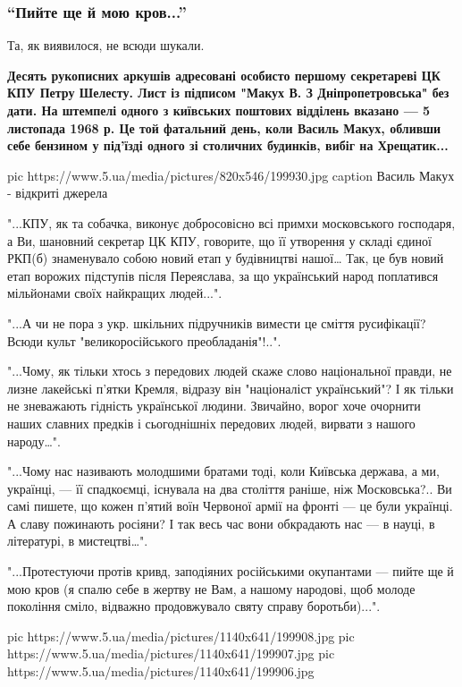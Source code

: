 \subsubsection{\enquote{Пийте ще й мою кров...}}

Та, як виявилося, не всюди шукали.

{\bfseries
Десять рукописних аркушів адресовані особисто першому секретареві ЦК КПУ
Петру Шелесту. Лист із підписом "Макух В. З Дніпропетровська" без дати.
На штемпелі одного з київських поштових відділень вказано --- 5 листопада
1968 р. Це той фатальний день, коли Василь Макух, обливши себе бензином
у під'їзді одного зі столичних будинків, вибіг на Хрещатик...
}

\ifcmt
pic https://www.5.ua/media/pictures/820x546/199930.jpg
caption Василь Макух - відкриті джерела
\fi


"...КПУ, як та собачка, виконує добросовісно всі примхи московського
господаря, а Ви, шановний секретар ЦК КПУ, говорите, що її утворення у
складі єдиної РКП(б) знаменувало собою новий етап у будівництві нашої…
Так, це був новий етап ворожих підступів після Переяслава, за що
український народ поплатився мільйонами своїх найкращих людей...".

"...А чи не пора з укр. шкільних підручників вимести це сміття
русифікації? Всюди культ "великоросійського преобладанія"!..".

"...Чому, як тільки хтось з передових людей скаже слово національної
правди, не лизне лакейські п'ятки Кремля, відразу він "націоналіст
український"? І як тільки не зневажають гідність української людини.
Звичайно, ворог хоче очорнити наших славних предків і сьогоднішніх
передових людей, вирвати з нашого народу…".

"...Чому нас називають молодшими братами тоді, коли Київська держава, а
ми, українці, --- її спадкоємці, існувала на два століття раніше, ніж
Московська?.. Ви самі пишете, що кожен п'ятий воїн Червоної армії на
фронті --- це були українці. А славу пожинають росіяни? І так весь час вони
обкрадають нас --- в науці, в літературі, в мистецтві…".

"...Протестуючи протів кривд, заподіяних російськими окупантами --- пийте ще
й мою кров (я спалю себе в жертву не Вам, а нашому народові, щоб молоде
покоління сміло, відважно продовжувало святу справу боротьби)...".

\ifcmt
pic https://www.5.ua/media/pictures/1140x641/199908.jpg
pic https://www.5.ua/media/pictures/1140x641/199907.jpg
pic https://www.5.ua/media/pictures/1140x641/199906.jpg
\fi

